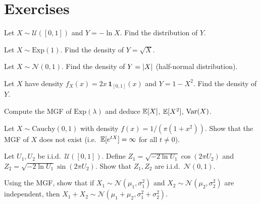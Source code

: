 \section{Exercises}

\begin{exercise}
Let $X \sim \mathcal{U}([0,1])$ and $Y = -\ln X$. Find the distribution of $Y$.
\end{exercise}

\begin{exercise}
Let $X \sim \mathrm{Exp}(1)$. Find the density of $Y = \sqrt{X}$.
\end{exercise}

\begin{exercise}
Let $X \sim \mathcal{N}(0,1)$. Find the density of $Y = \left| X \right|$
(half-normal distribution).
\end{exercise}

\begin{exercise}
Let $X$ have density $f_X(x) = 2x\,\mathbf{1}_{[0,1]}(x)$ and $Y = 1 - X^2$.
Find the density of $Y$.
\end{exercise}

\begin{exercise}
Compute the MGF of $\mathrm{Exp}(\lambda)$ and deduce $\mathbb{E}[X]$, $\mathbb{E}[X^2]$, $\mathrm{Var}(X)$.
\end{exercise}

\begin{exercise}
Let $X \sim \mathrm{Cauchy}(0,1)$ with density $f(x) = 1/(\pi(1+x^2))$.
Show that the MGF of $X$ does not exist (i.e.\ $\mathbb{E}[e^{tX}] = \infty$ for
all $t \neq 0$).
\end{exercise}

\begin{exercise}
Let $U_1, U_2$ be i.i.d.\ $\mathcal{U}([0,1])$. Define
$Z_1 = \sqrt{-2\ln U_1}\cos(2\pi U_2)$ and
$Z_2 = \sqrt{-2\ln U_1}\sin(2\pi U_2)$.
Show that $Z_1, Z_2$ are i.i.d.\ $\mathcal{N}(0,1)$.
\end{exercise}

\begin{exercise}
Using the MGF, show that if $X_1 \sim \mathcal{N}(\mu_1, \sigma_1^2)$ and
$X_2 \sim \mathcal{N}(\mu_2, \sigma_2^2)$ are independent, then
$X_1 + X_2 \sim \mathcal{N}(\mu_1+\mu_2, \sigma_1^2+\sigma_2^2)$.
\end{exercise}
